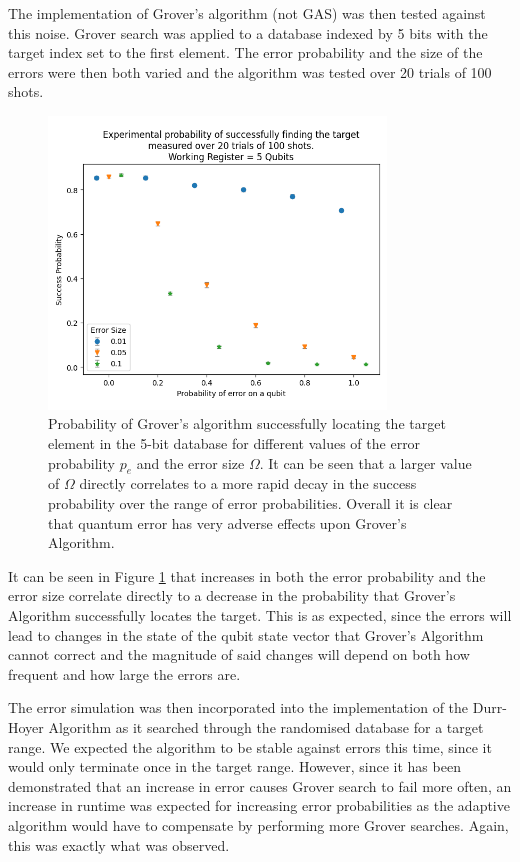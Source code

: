\documentclass{article}[11pt]
\begin{document}
The implementation of Grover's algorithm (not GAS) was then tested against this noise. Grover search was applied to a database indexed by 5 bits with the target index set to the first element. The error probability and the size of the errors were then both varied and the algorithm was tested over 20 trials of 100 shots.
\begin{figure}[H]
    \centering
    \includegraphics[width=0.8\textwidth]{Pictures/grover_errors.png}
    \caption{Probability of Grover's algorithm successfully locating the target element in the 5-bit database for different values of the error probability $p_e$ and the error size $\Omega$. It can be seen that a larger value of $\Omega$ directly correlates to a more rapid decay in the success probability over the range of error probabilities. Overall it is clear that quantum error has very adverse effects upon Grover's Algorithm.}
    \label{fig:grover_error}
\end{figure}

It can be seen in Figure \ref{fig:grover_error} that increases in both the error probability and the error size correlate directly to a decrease in the probability that Grover's Algorithm successfully locates the target. This is as expected, since the errors will lead to changes in the state of the qubit state vector that Grover's Algorithm cannot correct and the magnitude of said changes will depend on both how frequent and how large the errors are.

The error simulation was then incorporated into the implementation of the Durr-Hoyer Algorithm as it searched through the randomised database for a target range. We expected the algorithm to be stable against errors this time, since it would only terminate once in the target range. However, since it has been demonstrated that an increase in error causes Grover search to fail more often, an increase in runtime was expected for increasing error probabilities as the adaptive algorithm would have to compensate by performing more Grover searches. Again, this was exactly what was observed.
\end{document}
